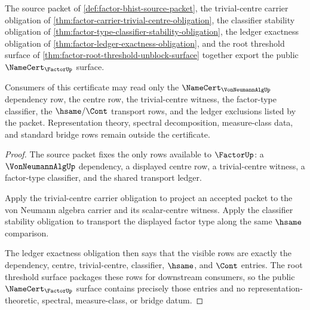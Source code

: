 \begin{theorem}
\label{thm:factor-public-namecert-export}
The source packet of \autoref{def:factor-bhist-source-packet}, the
trivial-centre carrier obligation of
\autoref{thm:factor-carrier-trivial-centre-obligation}, the classifier
stability obligation of
\autoref{thm:factor-type-classifier-stability-obligation}, the ledger
exactness obligation of \autoref{thm:factor-ledger-exactness-obligation}, and
the root threshold surface of \autoref{thm:factor-root-threshold-unblock-surface}
together export the public $\NameCert_{\FactorUp}$ surface.

Consumers of this certificate may read only the
$\NameCert_{\VonNeumannAlgUp}$ dependency row, the centre row, the
trivial-centre witness, the factor-type classifier, the $\hsame/\Cont$
transport rows, and the ledger exclusions listed by the packet. Representation
theory, spectral decomposition, measure-class data, and standard bridge rows
remain outside the certificate.
\end{theorem}
\begin{proof}
The source packet fixes the only rows available to $\FactorUp$: a
$\VonNeumannAlgUp$ dependency, a displayed centre row, a trivial-centre
witness, a factor-type classifier, and the shared transport ledger.

Apply the trivial-centre carrier obligation to project an accepted packet to
the von Neumann algebra carrier and its scalar-centre witness. Apply the
classifier stability obligation to transport the displayed factor type along
the same $\hsame$ comparison.

The ledger exactness obligation then says that the visible rows are exactly the
dependency, centre, trivial-centre, classifier, $\hsame$, and $\Cont$ entries.
The root threshold surface packages these rows for downstream consumers, so the
public $\NameCert_{\FactorUp}$ surface contains precisely those entries and no
representation-theoretic, spectral, measure-class, or bridge datum.
\end{proof}


